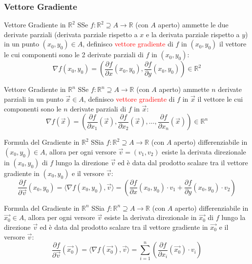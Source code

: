 \documentclass{article}  %
\begin{document}
\subsubsection{Vettore Gradiente}
\begin{definition}{Vettore Gradiente in $\mathbb{R}^2$}
	SSe $f: \mathbb{R}^2 \supseteq A \to \mathbb{R}$ (con $A$ aperto) ammette le due derivate parziali (derivata parziale rispetto a $x$ e la derivata parziale rispetto a $y$)
	in un punto $(x_0,y_0) \in A$, definisco \textcolor{red}{vettore gradiente} di $f$ in
	$(x_0,y_0)$ il vettore le cui componenti sono le 2 derivate parziali di $f$ in $(x_0,y_0)$:
	\[
		\nabla f(x_0,y_0)=\left(\frac{\partial f}{\partial x}(x_0,y_0), \frac{\partial f}{\partial y}(x_0,y_0) \right) \in \mathbb{R}^2
	\]
\end{definition}
\begin{definition}{Vettore Gradiente in $\mathbb{R}^n$}
	SSe $f: \mathbb{R}^n \supseteq A \to \mathbb{R}$ (con $A$ aperto) ammette $n$ derivate parziali in un punto $\vec{x} \in A$, definisco \textcolor{red}{vettore gradiente} di $f$ in
	$\vec{x}$ il vettore le cui componenti sono le $n$ derivate parziali di $f$ in $\vec{x}$:
	\[
		\nabla f(\vec{x})=\left(\frac{\partial f}{\partial x_1}(\vec{x}),\frac{\partial f}{\partial x_2}(\vec{x}), \dots,\frac{\partial f}{\partial x_n}(\vec{x}) \right) \in \mathbb{R}^n
	\]
\end{definition}
\begin{theorem}{Formula del Gradiente in $\mathbb{R}^2$}
	SSia $f: \mathbb{R}^2 \supseteq A \to \mathbb{R}$ (con $A$ aperto) differenziabile in $(x_0,y_0) \in A$, allora per ogni versore $\vec{v}=(v_1,v_2)$ esiste
	la derivata direzionale in $(x_0,y_0)$ di $f$ lungo la direzione $\vec{v}$ ed è data dal prodotto scalare tra il vettore gradiente in $(x_0,y_0)$ e il versore $\vec{v}$:
	\[
		\frac{\partial f}{\partial \vec{v}}(x_0,y_0) = \langle \nabla f(x_0,y_0), \vec{v} \rangle = \left(\frac{\partial f}{\partial x}(x_0,y_0) \cdot v_1 + \frac{\partial f}{\partial y}(x_0,y_0) \cdot v_2 \right)
	\]
\end{theorem}
\begin{theorem}{Formula del Gradiente in $\mathbb{R}^n$}
	SSia $f: \mathbb{R}^n \supseteq A \to \mathbb{R}$ (con $A$ aperto) differenziabile in $\vec{x_0} \in A$, allora per ogni versore $\vec{v}$ esiste
	la derivata direzionale in $\vec{x_0}$ di $f$ lungo la direzione $\vec{v}$ ed è data dal prodotto scalare tra il vettore gradiente in $\vec{x_0}$ e il versore $\vec{v}$:
	\[
		\frac{\partial f}{\partial \vec{v}}(\vec{x_0}) = \langle \nabla f(\vec{x_0}), \vec{v} \rangle = \sum_{i=1}^{n}\left(\frac{\partial f}{\partial x_i}(\vec{x_0}) \cdot v_i \right)
	\]
\end{theorem}
\end{document}
